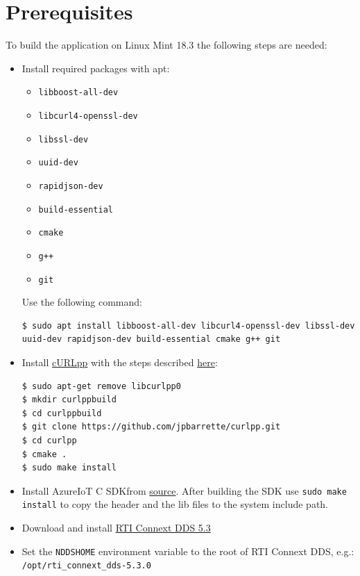 \documentclass{article}
\begin{document}
\section{Prerequisites}

To build the application on Linux Mint 18.3 the following steps are needed:

\begin{itemize}
\item Install required packages with apt: 
\begin{itemize}
\item \verb+libboost-all-dev+
\item \verb+libcurl4-openssl-dev+
\item \verb+libssl-dev+ %
\item \verb+uuid-dev+
\item \verb+rapidjson-dev+
\item \verb+build-essential+
\item \verb+cmake+
\item \verb!g++!
\item \verb+git+
\end{itemize}
Use the following command:
\begin{lstlisting}
$ sudo apt install libboost-all-dev libcurl4-openssl-dev libssl-dev uuid-dev rapidjson-dev build-essential cmake g++ git
\end{lstlisting}
\item Install \href{http://www.curlpp.org/}{cURLpp} with the steps described \href{https://github.com/beniz/deepdetect/issues/126}{here}:
\begin{verbatim}
$ sudo apt-get remove libcurlpp0
$ mkdir curlppbuild
$ cd curlppbuild
$ git clone https://github.com/jpbarrette/curlpp.git
$ cd curlpp
$ cmake .
$ sudo make install
\end{verbatim} 
\item Install AzureIoT C SDKfrom \href{https://github.com/Azure/azure-iot-sdk-c/blob/master/doc/devbox_setup.md}{source}. After building the SDK use \verb+sudo make install+ to copy the header and the lib files to the system include path.
\item Download and install \href{https://www.rti.com/gettingstarted/installlinux_secure}{RTI Connext DDS 5.3}
\item Set the \verb+NDDSHOME+ environment variable to the root of RTI Connext DDS, e.g.: \verb+/opt/rti_connext_dds-5.3.0+
\end{itemize}
\end{document}
